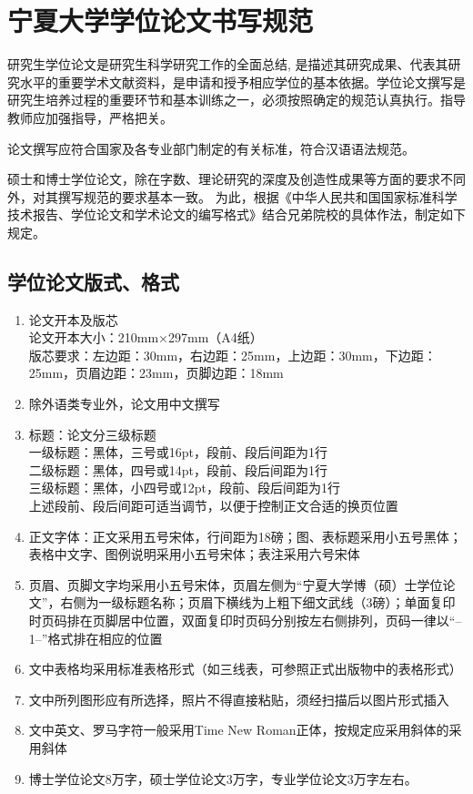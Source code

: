 \chapter{宁夏大学学位论文书写规范}

研究生学位论文是研究生科学研究工作的全面总结, 是描述其研究成果、代表其研究水平的重要学术文献资料，是申请和授予相应学位的基本依据。学位论文撰写是研究生培养过程的重要环节和基本训练之一，必须按照确定的规范认真执行。指导教师应加强指导，严格把关。

论文撰写应符合国家及各专业部门制定的有关标准，符合汉语语法规范。

硕士和博士学位论文，除在字数、理论研究的深度及创造性成果等方面的要求不同外，对其撰写规范的要求基本一致。
为此，根据《中华人民共和国国家标准科学技术报告、学位论文和学术论文的编写格式》结合兄弟院校的具体作法，制定如下规定。

\section{学位论文版式、格式}

\begin{enumerate}
	\item 论文开本及版芯\\
	论文开本大小：210mm×297mm（A4纸）\\
	版芯要求：左边距：30mm，右边距：25mm，上边距：30mm，下边距：25mm，页眉边距：23mm，页脚边距：18mm
	\item 除外语类专业外，论文用中文撰写
	\item 标题：论文分三级标题\\
	一级标题：黑体，三号或16pt，段前、段后间距为1行\\
	二级标题：黑体，四号或14pt，段前、段后间距为1行\\
	三级标题：黑体，小四号或12pt，段前、段后间距为1行\\
	上述段前、段后间距可适当调节，以便于控制正文合适的换页位置
	\item 正文字体：正文采用五号宋体，行间距为18磅；图、表标题采用小五号黑体；表格中文字、图例说明采用小五号宋体；表注采用六号宋体
	\item 页眉、页脚文字均采用小五号宋体，页眉左侧为“宁夏大学博（硕）士学位论文”，右侧为一级标题名称；页眉下横线为上粗下细文武线（3磅）；单面复印时页码排在页脚居中位置，双面复印时页码分别按左右侧排列，页码一律以“--1--”格式排在相应的位置
	\item 文中表格均采用标准表格形式（如三线表，可参照正式出版物中的表格形式）
	\item 文中所列图形应有所选择，照片不得直接粘贴，须经扫描后以图片形式插入
	\item 文中英文、罗马字符一般采用Time New Roman正体，按规定应采用斜体的采用斜体
	\item 博士学位论文8万字，硕士学位论文3万字，专业学位论文3万字左右。
\end{enumerate}

